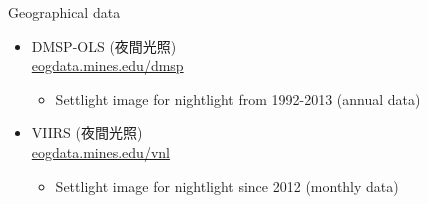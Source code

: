 \documentclass[hyperref={pdfpagelabels=false}]{beamer}
\begin{document}
\begin{frame}{Geographical data}
\begin{itemize} 
\item DMSP-OLS (夜間光照) \\ \href{https://eogdata.mines.edu/products/dmsp/}{eogdata.mines.edu/dmsp}  
\vspace{0.2cm}
\begin{itemize} 
\vspace{0.2cm}
\item Settlight image for nightlight from 1992-2013 (annual data) 
\end{itemize}
\vspace{0.2cm}
\item VIIRS (夜間光照) \\ \href{https://eogdata.mines.edu/products/vnl/}{eogdata.mines.edu/vnl}  
\vspace{0.2cm}
\begin{itemize} 
\vspace{0.2cm}
\item Settlight image for nightlight since 2012 (monthly data) 
\end{itemize}
\vspace{0.2cm}


\end{itemize}
\end{frame}
\end{document}
